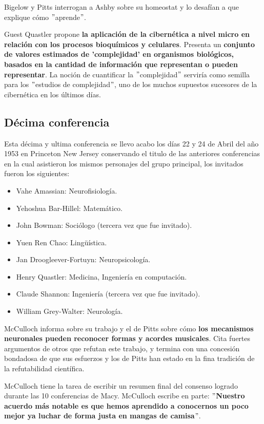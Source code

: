 \documentclass[11pt]{article}
\begin{document}
		Bigelow y Pitts interrogan a Ashby sobre su homeostat y lo desafían a que explique cómo $"$aprende$"$.\par
		Guest Quastler propone \textbf{la aplicación de la cibernética a nivel micro en relación con los procesos bioquímicos y celulares}. Presenta un \textbf{conjunto de valores estimados de 'complejidad' en organismos biológicos, basados en la cantidad de información que representan o pueden representar}. La noción de cuantificar la $"$complejidad$"$ serviría como semilla para los $"$estudios de complejidad$"$, uno de los muchos supuestos sucesores de la cibernética en los últimos días.\par
		\subsection{Décima conferencia}
		Esta décima y ultima conferencia se llevo acabo los días 22 y 24 de Abril del año 1953 en Princeton New Jersey  conservando el titulo de las anteriores conferencias en la cual asistieron los mismos personajes del grupo principal, los invitados fueron los siguientes:
		\begin{itemize}
    		\item Vahe Amassian: Neurofisiología.
    		\item Yehoshua Bar-Hillel: Matemático.
    		\item John Bowman: Sociólogo (tercera vez que fue invitado).
			\item Yuen Ren Chao: Lingüística.
    		\item Jan Droogleever-Fortuyn: Neuropsicología.
    		\item Henry Quastler: Medicina, Ingeniería en computación.
    		\item Claude Shannon: Ingeniería (tercera vez que fue invitado).
    		\item William Grey-Walter: Neurología.
		\end{itemize}
		McCulloch informa sobre su trabajo y el de Pitts sobre cómo \textbf{los mecanismos neuronales pueden reconocer formas y acordes musicales}. Cita fuertes argumentos de otros que refutan este trabajo, y termina con una concesión bondadosa de que sus esfuerzos y los de Pitts han estado en la fina tradición de la refutabilidad científica.\par
		McCulloch tiene la tarea de escribir un resumen final del consenso logrado durante las 10 conferencias de Macy. McCulloch escribe en parte:\textbf{ $"$Nuestro acuerdo más notable es que hemos aprendido a conocernos un poco mejor ya luchar de forma justa en mangas de camisa$"$}. \par
\end{document}
